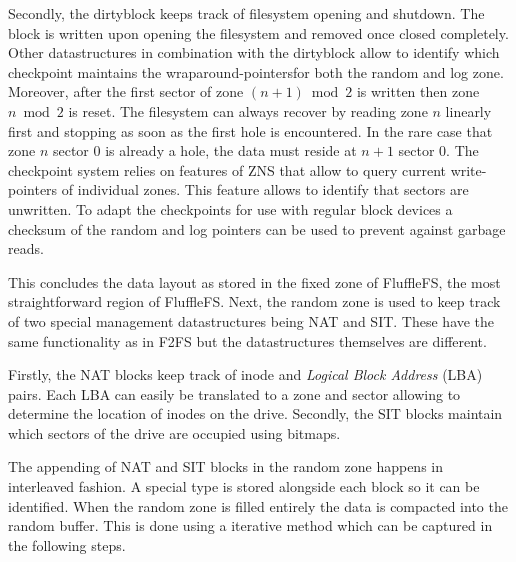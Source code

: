 Secondly, the dirtyblock keeps track of filesystem opening and shutdown. The 
block is written upon opening the filesystem and removed once closed completely.
Other datastructures in combination with the dirtyblock allow to identify which
checkpoint maintains the wraparound-pointers\footnotemark[13] for both the random
and log zone. Moreover, after the first sector of zone $(n+1) \bmod{2}$ is
written then zone $n \bmod{2}$ is reset. The filesystem can always recover by
reading zone $n$ linearly first and stopping as soon as the first hole is
encountered. In the rare case that zone $n$ sector $0$ is already a hole, the
data must reside at $n+1$ sector $0$. The checkpoint system relies on features
of ZNS that allow to query current write-pointers of individual zones. This
feature allows to identify that sectors are unwritten. To adapt the checkpoints
for use with regular block devices a checksum of the random and log pointers can
be used to prevent against garbage reads.


This concludes the data layout as stored in the fixed zone of FluffleFS, the
most straightforward region of FluffleFS. Next, the random zone is used to keep
track of two special management datastructures being NAT and SIT. These have the
same functionality as in F2FS but the datastructures themselves are different.

Firstly, the NAT blocks keep track of inode and \textit{Logical Block Address}
(LBA) pairs. Each LBA can easily be translated to a zone and sector allowing to
determine the location of inodes on the drive. Secondly, the SIT blocks
maintain which sectors of the drive are occupied using bitmaps.

The appending of NAT and SIT blocks in the random zone happens in interleaved
fashion. A special type is stored alongside each block so it can be identified.
When the random zone is filled entirely the data is compacted into the random
buffer. This is done using a iterative method which can be captured in the
following steps.

